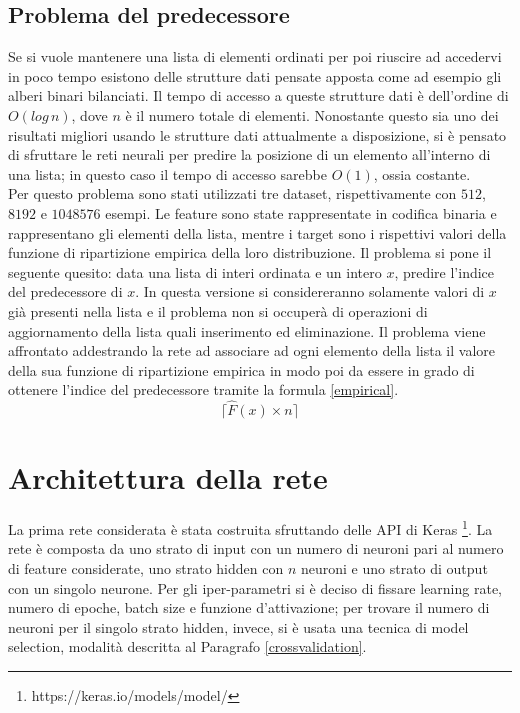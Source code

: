 \documentclass[12pt]{report}
\begin{document}
\subsection{Problema del predecessore}\label{probPred}
Se si vuole mantenere una lista di elementi ordinati per poi riuscire ad accedervi in poco tempo esistono delle strutture dati pensate apposta come ad esempio gli alberi binari bilanciati. Il tempo di accesso a queste strutture dati è dell'ordine di $O(log\,n)$, dove $n$ è il numero totale di elementi. Nonostante questo sia uno dei risultati migliori usando le strutture dati attualmente a disposizione, si è pensato di sfruttare le reti neurali per predire la posizione di un elemento all'interno di una lista; in questo caso il tempo di accesso sarebbe $O(1)$, ossia costante. \\
Per questo problema sono stati utilizzati tre dataset, rispettivamente con $512$, $8192$ e $1048576$ esempi. Le feature sono state rappresentate in codifica binaria e rappresentano gli elementi della lista, mentre i target sono i rispettivi valori della funzione di ripartizione empirica della loro distribuzione.
Il problema si pone il seguente quesito: data una lista di interi ordinata e un intero $x$, predire l'indice del predecessore di $x$. In questa versione si considereranno solamente valori di $x$ già presenti nella lista e il problema non si occuperà di operazioni di aggiornamento della lista quali inserimento ed eliminazione.
Il problema viene affrontato addestrando la rete ad associare ad ogni elemento della lista il valore della sua funzione di ripartizione empirica in modo poi da essere in grado di ottenere l'indice del predecessore tramite la formula \eqref{empirical}. 
\begin{equation}
\lceil\hat{F}(x)\times n\rceil
\label{empirical}
\end{equation}

\section{Architettura della rete}\label{architettura}
La prima rete considerata è stata costruita sfruttando delle API di Keras \footnote{https://keras.io/models/model/}. La rete è composta da uno strato di input con un numero di neuroni pari al numero di feature considerate, uno strato hidden con $n$ neuroni e uno strato di output con un singolo neurone. Per gli iper-parametri si è deciso di fissare learning rate, numero di epoche, batch size e funzione d'attivazione; per trovare il numero di neuroni per il singolo strato hidden, invece, si è usata una tecnica di model selection, modalità descritta al Paragrafo \ref{crossvalidation}.
\end{document}
